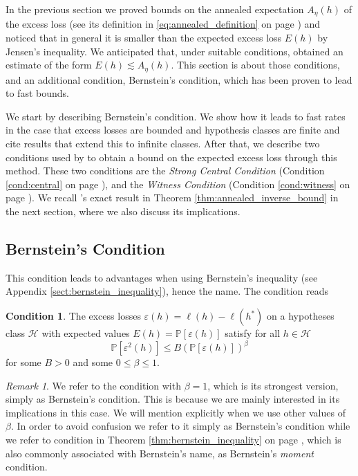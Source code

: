 \documentclass{uvamath}
\newcommand*{\calH}{\mathcal{H}}
\newcommand*{\bbP}{\mathbb{P}}
\theoremstyle{remark}
\newtheorem{remark}[theorem]{Remark}
\theoremstyle{definition}
\theoremstyle{definition}
\theoremstyle{definition}
\theoremstyle{definition}
\theoremstyle{definition}
\newtheorem{condition}{Condition}
\begin{document}
In the previous section we proved bounds on the annealed expectation
$A_\eta(h)$ of the excess loss (see its definition in
\eqref{eq:annealed_definition} on page
\pageref{eq:annealed_definition}) and noticed that in general it is
smaller than the expected excess loss $E(h)$ by Jensen's
inequality. We anticipated that, under suitable conditions,
\citet{grunwald_fast_2016} obtained an estimate of the form
$E(h)\lesssim A_{\eta}(h)$. This section is about those conditions,
and an additional condition, Bernstein's condition, which has been
proven to lead to fast bounds.

We start by describing Bernstein's condition. We show how it leads to
fast rates in the case that excess losses are bounded and hypothesis
classes are finite and cite results that extend this to infinite
classes. After that, we describe two conditions used by
\citet{grunwald_fast_2016} to obtain a bound on the expected excess
loss through this method. These two conditions are the \textit{Strong
  Central Condition} (Condition \ref{cond:central} on page
\pageref{cond:central}), and the \textit{Witness Condition} (Condition
\ref{cond:witness} on page \pageref{cond:witness}). We recall
\citeauthor{grunwald_fast_2016}'s exact result in Theorem
\ref{thm:annealed_inverse_bound} in the next section, where we also
discuss its implications.


\subsection{Bernstein's Condition \label{sect:bernstein}}

This condition leads to advantages when using Bernstein's inequality
(see Appendix \ref{sect:bernstein_inequality}), hence the name. The
condition reads
\begin{condition}\label{cond:bernstein}
  The excess losses $\varepsilon(h) = \ell(h)-\ell(h^*)$ on a
  hypotheses class $\calH$ with expected values
  $E(h) = \bbP[\varepsilon(h)]$ satisfy for all $h\in\calH$
  \begin{equation*}
    \bbP[\varepsilon^2(h)]\leq B (\bbP[\varepsilon(h)])^\beta
  \end{equation*}
  for some $B>0$ and some $0\leq\beta\leq1$.
\end{condition}
\begin{remark}
  We refer to the condition with $\beta = 1$, which is its strongest
  version, simply as Bernstein's condition. This is because we are
  mainly interested in its implications in this case. We will mention
  explicitly when we use other values of $\beta$. In order to avoid
  confusion we refer to it simply as Bernstein's condition while we
  refer to condition in Theorem \ref{thm:bernstein_inequality} on page
  \pageref{thm:bernstein_inequality}, which is also commonly
  associated with Bernstein's name, as Bernstein's \textit{moment}
  condition.
\end{remark}
\end{document}
